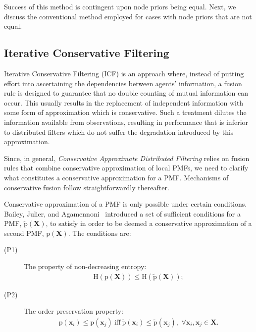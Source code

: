 \documentclass[journal]{IEEEtran}
\newcommand{\vect}[1]{{\mathbf{#1}}}
\theoremstyle{remark}
\newcommand{\pr}{\textrm{p}}
\theoremstyle{definition}
\begin{document}
Success of this method is contingent upon node priors being equal. Next,
we discuss the conventional method employed for cases with
node priors that are not equal.

\subsection{Iterative Conservative Filtering} 

Iterative Conservative Filtering  (ICF) is an approach where, instead of
putting effort into ascertaining the dependencies between agents' information,
a fusion rule is designed to guarantee that no double counting of mutual
information can occur.  This usually results in the replacement of independent
information with some form of approximation which is conservative.  Such a
treatment dilutes the information available from observations, resulting in
performance that is inferior to distributed filters which do not suffer the
degradation introduced by this approximation.

Since, in general, \emph{Conservative Approximate Distributed Filtering} relies
on fusion rules that combine conservative approximation of local PMFs, we need
to clarify what constitutes a conservative approximation for a PMF. 
Mechanisms of conservative fusion follow straightforwardly thereafter. 

Conservative approximation of a PMF is only possible under certain conditions.
Bailey, Julier, and Agamennoni~\cite{bailey2012conservative} introduced a set of
sufficient conditions for a PMF, $\tilde{\pr}(\vect{X})$, to satisfy in order to
be deemed a conservative approximation of a second PMF, $\pr(\vect{X})$. The
conditions are:
\begin{description}
\item [(P1)] The property of non-decreasing entropy:
$$\begin{aligned}
\text{H}(\pr(\vect{X})) \leq \text{H}(\tilde{\pr}(\vect{X}));
\end{aligned}$$
\item [(P2)] The order preservation property: 
$$\begin{aligned}
\pr(\vect{x}_i) \leq \pr(\vect{x}_j) \ \text{iff}\  \tilde{\pr}(\vect{x}_i) \leq \tilde{\pr}(\vect{x}_j), \,\, \forall \vect{x}_i,\vect{x}_j\in\vect{X}.
 \end{aligned}$$
\end{description}
\end{document}
